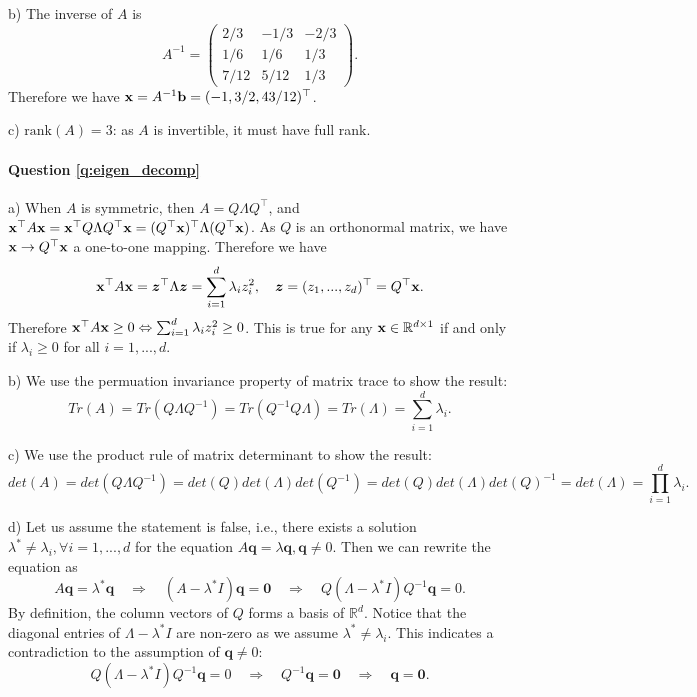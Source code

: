 b) The inverse of $A$ is 
\begin{equation*}
A^{-1} = \begin{pmatrix}
2/3 & -1/3 & -2/3 \\
1/6 & 1/6 & 1/3 \\
7/12 & 5/12 & 1/3
\end{pmatrix}.
\end{equation*}
Therefore we have $\mathbf{x} = A^{-1} \mathbf{b} = (-1, 3/2, 43/12)^\top$.

c) $\text{rank}(A) = 3$: as $A$ is invertible, it must have full rank.

\paragraph{Question \ref{q:eigen_decomp}}

a) When $A$ is symmetric, then $A = Q \Lambda Q^\top$, and $\mathbf{x}^\top A \mathbf{x} = \mathbf{x}^\top Q \Lambda Q^\top \mathbf{x} = (Q^\top \mathbf{x})^\top \Lambda (Q^\top \mathbf{x})$. As $Q$ is an orthonormal matrix, we have $\mathbf{x} \rightarrow Q^\top \mathbf{x}$ a one-to-one mapping. Therefore we have
$$\mathbf{x}^\top A \mathbf{x} = \bm{z}^\top \Lambda \bm{z} = \sum_{i=1}^d \lambda_i z_i^2, \quad \bm{z} = (z_1, ..., z_d)^\top = Q^\top \mathbf{x}.$$
Therefore $\mathbf{x}^\top A \mathbf{x} \geq 0 \Leftrightarrow \sum_{i=1}^d \lambda_i z_i^2 \geq 0$. This is true for any $\mathbf{x} \in \mathbb{R}^{d \times 1}$ if and only if $\lambda_i \geq 0$ for all $i = 1,..., d$.

b) We use the permuation invariance property of matrix trace to show the result:
$$Tr(A) = Tr(Q \Lambda Q^{-1}) = Tr(Q^{-1} Q \Lambda) = Tr(\Lambda) = \sum_{i=1}^d \lambda_i.$$

c) We use the product rule of matrix determinant to show the result:
$$det(A) = det(Q \Lambda Q^{-1}) = det(Q) det(\Lambda) det(Q^{-1}) = det(Q) det(\Lambda) det(Q)^{-1} = det(\Lambda) = \prod_{i=1}^d \lambda_i.$$

d) Let us assume the statement is false, i.e., there exists a solution $\lambda^* \neq \lambda_i, \forall i = 1, ..., d$ for the equation $A \bm{q} = \lambda \bm{q}, \bm{q} \neq 0$. Then we can rewrite the equation as
$$A \bm{q} = \lambda^* \bm{q} \quad \Rightarrow \quad (A - \lambda^* I) \bm{q} = \bm{0} \quad \Rightarrow \quad Q (\Lambda - \lambda^* I) Q^{-1} \bm{q} = 0.$$
By definition, the column vectors of $Q$ forms a basis of $\mathbb{R}^d$. Notice that the diagonal entries of $\Lambda - \lambda^* I$ are non-zero as we assume $\lambda^* \neq \lambda_i$. This indicates a contradiction to the assumption of $\bm{q} \neq 0$:
$$Q (\Lambda - \lambda^* I) Q^{-1} \bm{q} = 0 \quad \Rightarrow \quad Q^{-1}\bm{q} = \bm{0} \quad \Rightarrow \quad \bm{q} = \bm{0}.$$
